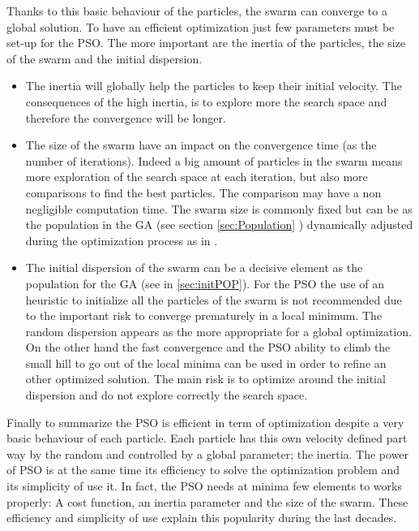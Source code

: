Thanks to this basic behaviour of the particles, the swarm can converge to a global solution. 
To have an efficient optimization just few parameters must be set-up for the PSO.  
The more important are the inertia of the particles, the size of the swarm and the initial dispersion.
\begin{itemize}
\item The inertia will globally help the particles to keep their initial velocity. The consequences of the high inertia, is to explore more the search space and therefore the convergence will be longer. 
\item The size of the swarm  have an impact on the convergence time (as the  number of iterations).  Indeed a big amount of particles in the swarm  means more exploration of the search space at each iteration, but also more comparisons to find the best particles. The comparison may have a non negligible computation time. 
The swarm size is commonly fixed but can be as the population in the GA (see section \ref{sec:Population} ) dynamically adjusted during the optimization process as in \cite{228*leong2008}. 

\item The initial dispersion of the swarm can be a decisive element as the population for the GA (see in \ref{sec:initPOP}). For the PSO the use of an heuristic to initialize all the particles of the swarm is not recommended due to the important risk to converge prematurely in a local minimum. The random dispersion appears as the more appropriate for a global optimization. On the other hand the fast convergence and the PSO ability to climb the small hill to go out of the local minima can be used in order to refine an other optimized solution. The main risk is to optimize around the initial dispersion and do not explore correctly the search space.  
\end{itemize}

Finally to summarize the PSO is efficient in term of optimization despite a very basic behaviour of each  particle. Each particle has this own velocity defined part way by the random and controlled by a global parameter; the inertia.
 The power of PSO is at the same time its efficiency to solve the optimization problem and its simplicity of use it. In fact, the PSO needs at minima few elements to works properly:
 A cost function, an inertia parameter and the size of the swarm. These efficiency and simplicity of use explain this popularity during the last decades.
 





